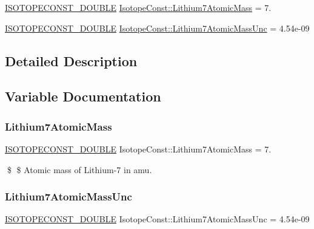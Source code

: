 \begin{DoxyCompactItemize}
\item 
\mbox{\hyperlink{group___isotope_const-_macros_ga8f45a7272ce02c0b4c65c44636ed719a}{I\+S\+O\+T\+O\+P\+E\+C\+O\+N\+S\+T\+\_\+\+D\+O\+U\+B\+LE}} \mbox{\hyperlink{group___isotope_const-_lithium-_li7_ga82c7d8e4df8a1dd984961ded80fff5b7}{Isotope\+Const\+::\+Lithium7\+Atomic\+Mass}} = 7.
\item 
\mbox{\hyperlink{group___isotope_const-_macros_ga8f45a7272ce02c0b4c65c44636ed719a}{I\+S\+O\+T\+O\+P\+E\+C\+O\+N\+S\+T\+\_\+\+D\+O\+U\+B\+LE}} \mbox{\hyperlink{group___isotope_const-_lithium-_li7_ga059f6ad35bfd2e116233b098feea5a64}{Isotope\+Const\+::\+Lithium7\+Atomic\+Mass\+Unc}} = 4.\+54e-\/09
\end{DoxyCompactItemize}


\subsection{Detailed Description}


\subsection{Variable Documentation}
\mbox{\label{group___isotope_const-_lithium-_li7_ga82c7d8e4df8a1dd984961ded80fff5b7}} 
\subsubsection{\texorpdfstring{Lithium7\+Atomic\+Mass}{Lithium7AtomicMass}}
{\footnotesize\ttfamily \mbox{\hyperlink{group___isotope_const-_macros_ga8f45a7272ce02c0b4c65c44636ed719a}{I\+S\+O\+T\+O\+P\+E\+C\+O\+N\+S\+T\+\_\+\+D\+O\+U\+B\+LE}} Isotope\+Const\+::\+Lithium7\+Atomic\+Mass = 7.}

\$ \$ Atomic mass of Lithium-\/7 in amu. \mbox{\label{group___isotope_const-_lithium-_li7_ga059f6ad35bfd2e116233b098feea5a64}} 
\subsubsection{\texorpdfstring{Lithium7\+Atomic\+Mass\+Unc}{Lithium7AtomicMassUnc}}
{\footnotesize\ttfamily \mbox{\hyperlink{group___isotope_const-_macros_ga8f45a7272ce02c0b4c65c44636ed719a}{I\+S\+O\+T\+O\+P\+E\+C\+O\+N\+S\+T\+\_\+\+D\+O\+U\+B\+LE}} Isotope\+Const\+::\+Lithium7\+Atomic\+Mass\+Unc = 4.\+54e-\/09}

